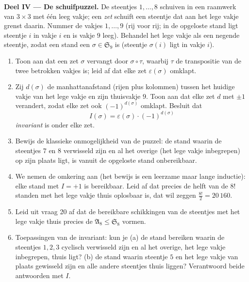 \begin{problem}
\medskip
\noindent\textbf{Deel IV --- De schuifpuzzel.} De steentjes $1, \dots, 8$
schuiven in een raamwerk van $3 \times 3$ met één leeg vakje; een
\emph{zet} schuift een steentje dat aan het lege vakje grenst daarin. Nummer
de vakjes $1, \dots, 9$ (rij voor rij; in de opgeloste stand ligt steentje
$i$ in vakje $i$ en is vakje $9$ leeg). Behandel het lege vakje als een
negende steentje, zodat een stand een  $\sigma \in \mathfrak
S_9$ is (steentje $\sigma(i)$ ligt in vakje $i$).
\begin{enumerate}[resume]
  \item Toon aan dat een zet $\sigma$ vervangt door $\sigma \circ \tau$,
        waarbij $\tau$ de transpositie van de twee betrokken vakjes is;
        leid af dat elke zet $\varepsilon(\sigma)$ omklapt.
  \item Zij $d(\sigma)$ de manhattanafstand (rijen plus kolommen) tussen
        het huidige vakje van het lege vakje en zijn thuisvakje $9$.
        Toon aan dat elke zet $d$ met $\pm1$ verandert, zodat elke zet
        ook $(-1)^{d(\sigma)}$ omklapt. Besluit dat
        \[
        I(\sigma) = \varepsilon(\sigma)\cdot(-1)^{d(\sigma)}
        \]
        \emph{invariant} is onder elke zet.
  \item Bewijs de klassieke onmogelijkheid van de puzzel: de stand
        waarin de steentjes $7$ en $8$ verwisseld zijn en al het overige
        (het lege vakje inbegrepen) op zijn plaats ligt, is vanuit de
        opgeloste stand onbereikbaar.
  \item We nemen de omkering aan (het bewijs is een leerzame maar lange
        inductie): elke stand met $I = +1$ is bereikbaar. Leid af dat
        precies de helft van de $8!$ standen met het lege vakje thuis
        oplosbaar is, dat wil zeggen $\frac{8!}2 = 20\,160$.
  \item Leid uit vraag 20 af dat de bereikbare schikkingen van de
        steentjes met het lege vakje thuis precies de 
        $\mathfrak A_8 \leq \mathfrak S_8$ vormen.
  \item Toepassingen van de invariant: kun je (a) de stand bereiken
        waarin de steentjes $1, 2, 3$ cyclisch verwisseld zijn en al het
        overige, het lege vakje inbegrepen, thuis ligt? (b) de stand
        waarin steentje $5$ en het lege vakje van plaats gewisseld zijn
        en alle andere steentjes thuis liggen? Verantwoord beide
        antwoorden met $I$.
\end{enumerate}


\end{problem}
